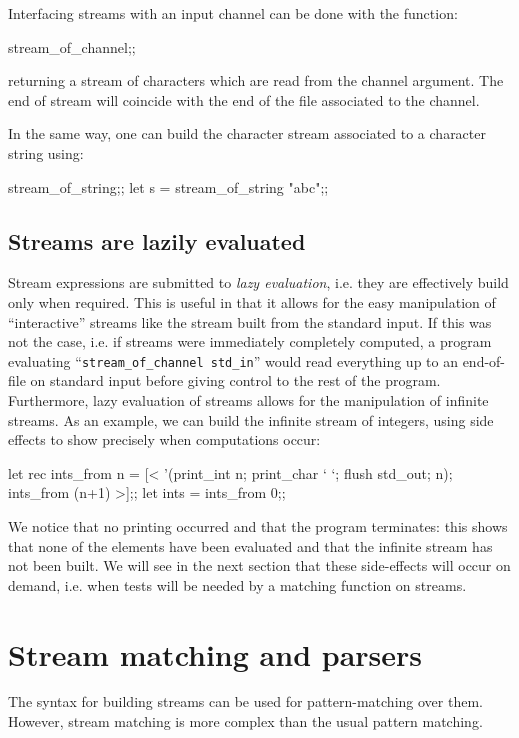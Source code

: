 Interfacing streams with an input channel can be done with the
function:
\begin{caml_example}
stream_of_channel;;
\end{caml_example}
returning a stream of characters which are read from the channel
argument. The end of stream will coincide with the end of the file
associated to the channel.

In the same way, one can build the character stream associated to a
character string using:
\begin{caml_example}
stream_of_string;;
let s = stream_of_string "abc";;
\end{caml_example}

\subsection{Streams are lazily evaluated}

Stream expressions are submitted to {\em lazy evaluation}, i.e. they
are effectively build only when required. This is useful in that it
allows for the easy manipulation of ``interactive'' streams like the
stream built from the standard input. If this was not the case, i.e.
if streams were immediately completely computed, a program evaluating
``\verb|stream_of_channel std_in|'' would read everything up to an
end-of-file on standard input before giving control to the rest of the
program. Furthermore, lazy evaluation of streams allows for the
manipulation of infinite streams.  As an example, we can build the
infinite stream of integers, using side effects to show precisely when
computations occur:
\begin{caml_example}
let rec ints_from n =
   [< '(print_int n; print_char ` `; flush std_out; n);
      ints_from (n+1) >];;
let ints = ints_from 0;;
\end{caml_example}
We notice that no printing occurred and that the program terminates:
this shows that none of the elements have been evaluated and that the
infinite stream has not been built. We will see in the next section
that these side-effects will occur on demand, i.e. when tests will be
needed by a matching function on streams.

\section{Stream matching and parsers}

The syntax for building streams can be used for pattern-matching over
them. However, stream matching is more complex than the usual pattern
matching.

